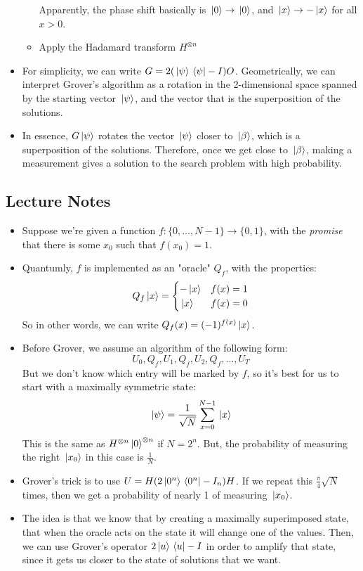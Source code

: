 \documentclass[10pt]{article}
\newcommand{\answer}[1]{\textcolor{green!80!black!}{#1}}
\begin{document}
\begin{itemize}
\begin{itemize}
					\answer{Apparently, the phase shift basically is \( \ket*{0} \to \ket*{0} \), and 
					\( \ket*{x} \to - \ket*{x}\) for all \( x > 0 \).}
				\item Apply the Hadamard transform \( H^{\otimes n} \)
			\end{itemize}
		\item For simplicity, we can write \( G = 2(\ket*{\psi}\bra*{\psi} - I) O \). Geometrically, we can interpret
			Grover's algorithm as a rotation in the 2-dimensional space spanned by the starting vector 
			\( \ket*{\psi} \), and the vector that is the superposition of the solutions. 
		\item In essence, \( G\ket*{\psi} \) rotates the vector \( \ket*{\psi} \) closer to \( \ket*{\beta} \), 
			which is a superposition of the solutions. Therefore, once we get close to \( \ket*{\beta} \), 
			making a measurement gives a solution to the search problem with high probability. 
	\end{itemize}
	\subsection{Lecture Notes}
	\begin{itemize}
		\item Suppose we're given a function \( f: \{0, \dots, N - 1\}  \to \{0, 1\}  \), with the \textit{promise}
			that there is some \( x_0 \) such that \( f(x_0) = 1 \).
		\item Quantumly, \( f \) is implemented as an "oracle" \( Q_f \), with the properties:
			\[
			Q_f \ket*{x} = \begin{cases}
				-\ket*{x} & f(x) = 1\\
				\ket*{x} & f(x) = 0
			\end{cases}
			\] 
			So in other words, we can write \( Q_f(x) = (-1)^{f(x)}\ket*{x} \). 
		\item Before Grover, we assume an algorithm of the following form:
			\[
			U_0, Q_f, U_1, Q_f, U_2, Q_f, \dots, U_T
			\] 
			But we don't know which entry will be marked by \( f \), so it's best for us to start with a 
			maximally symmetric state:
			\[
			\ket*{\psi }=  \frac{1}{\sqrt{N} }\sum_{x=0}^{N-1} \ket*{x}
			\] 
			This is the same as \( H^{\otimes n}\ket*{0}^{\otimes n}\) if \( N = 2^{n} \). But, the probability of 
			measuring the right \( \ket*{x_0} \) in this case is \( \frac{1}{N} \). 
		\item Grover's trick is to use \( U = H(2\ket*{0^{n}}\bra*{0^{n}} - I_n)H \). If we repeat this 
			\( \frac{\pi}{4}\sqrt{N}  \) times, then we get a probability of nearly 1 of measuring \( \ket*{x_0} \). 
		\item The idea is that we know that by creating a maximally superimposed state, 
			that when the oracle acts on the state 
			it will change one of the values. Then, we can use Grover's 
			operator \( 2\ket*{u}\bra*{u} - I \) in order to 
			amplify that state, since it gets us closer to the state of solutions that we want.     
	\end{itemize}
\end{document}
